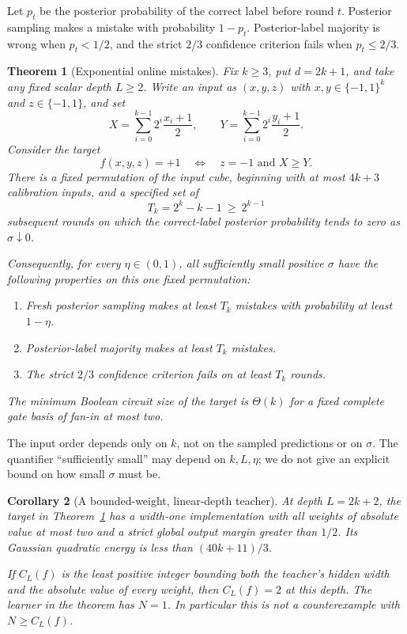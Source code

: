 \documentclass[11pt]{article}
\newtheorem{theorem}{Theorem}
\newtheorem{corollary}[theorem]{Corollary}
\theoremstyle{remark}\newtheorem{remark}[theorem]{Remark}
\begin{document}
Let $p_t$ be the posterior probability of the correct label before round
$t$. Posterior sampling makes a mistake with probability $1-p_t$.
Posterior-label majority is wrong when $p_t<1/2$, and the strict $2/3$
confidence criterion fails when $p_t\le2/3$.

\begin{theorem}[Exponential online mistakes]\label{thm:main}
Fix $k\ge3$, put $d=2k+1$, and take any fixed scalar depth $L\ge2$.
Write an input as $(x,y,z)$ with $x,y\in\{-1,1\}^k$ and $z\in\{-1,1\}$,
and set
\[
 X=\sum_{i=0}^{k-1}2^i\frac{x_i+1}{2},\qquad
 Y=\sum_{i=0}^{k-1}2^i\frac{y_i+1}{2}.
\]
Consider the target
\[
 f(x,y,z)=+1\quad\Longleftrightarrow\quad z=-1\text{ and }X\ge Y.
\]
There is a fixed permutation of the input cube, beginning with at most
$4k+3$ calibration inputs, and a specified set of
\[
 T_k=2^k-k-1\ \ge\ 2^{k-1}
\]
subsequent rounds on which the correct-label posterior probability tends
to zero as $\sigma\downarrow0$.

Consequently, for every $\eta\in(0,1)$, all sufficiently small positive
$\sigma$ have the following properties on this one fixed permutation:
\begin{enumerate}
\item Fresh posterior sampling makes at least $T_k$ mistakes with
      probability at least $1-\eta$.
\item Posterior-label majority makes at least $T_k$ mistakes.
\item The strict $2/3$ confidence criterion fails on at least $T_k$ rounds.
\end{enumerate}
The minimum Boolean circuit size of the target is $\Theta(k)$ for a
fixed complete gate basis of fan-in at most two.
\end{theorem}

The input order depends only on $k$, not on the sampled predictions or on
$\sigma$. The quantifier ``sufficiently small'' may depend on $k,L,\eta$;
we do not give an explicit bound on how small $\sigma$ must be.

\begin{corollary}[A bounded-weight, linear-depth teacher]\label{cor:teacher}
At depth $L=2k+2$, the target in Theorem~\ref{thm:main} has a width-one
implementation with all weights of absolute value at most two and a
strict global output margin greater than $1/2$. Its Gaussian quadratic
energy is less than $(40k+11)/3$.

If $C_L(f)$ is the least positive integer bounding both the teacher's
hidden width and the absolute value of every weight, then $C_L(f)=2$ at
this depth. The learner in the theorem has $N=1$. In particular this is
not a counterexample with $N\ge C_L(f)$.
\end{corollary}
\end{document}
